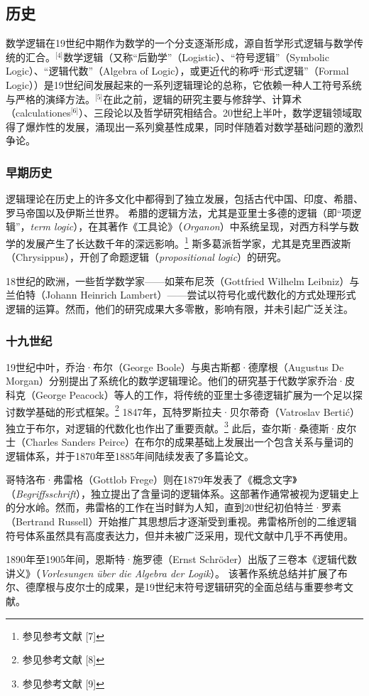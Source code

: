\subsection{历史}
数学逻辑在19世纪中期作为数学的一个分支逐渐形成，源自哲学形式逻辑与数学传统的汇合。\(^\text{[4]}\)数学逻辑（又称“后勤学”（Logistic）、“符号逻辑”（Symbolic Logic）、“逻辑代数”（Algebra of Logic），或更近代的称呼“形式逻辑”（Formal Logic））是19世纪间发展起来的一系列逻辑理论的总称，它依赖一种人工符号系统与严格的演绎方法。\(^\text{[5]}\)在此之前，逻辑的研究主要与修辞学、计算术（calculationes\(^\text{[6]}\)）、三段论以及哲学研究相结合。20世纪上半叶，数学逻辑领域取得了爆炸性的发展，涌现出一系列奠基性成果，同时伴随着对数学基础问题的激烈争论。
\subsubsection{早期历史}
逻辑理论在历史上的许多文化中都得到了独立发展，包括古代中国、印度、希腊、罗马帝国以及伊斯兰世界。  
希腊的逻辑方法，尤其是亚里士多德的逻辑（即“项逻辑”，\textit{term logic}），在其著作《工具论》（\textit{Organon}）中系统呈现，对西方科学与数学的发展产生了长达数千年的深远影响。\footnote{参见参考文献 [7]}  
斯多葛派哲学家，尤其是克里西波斯（Chrysippus），开创了命题逻辑（\textit{propositional logic}）的研究。

18世纪的欧洲，一些哲学数学家——如莱布尼茨（Gottfried Wilhelm Leibniz）与兰伯特（Johann Heinrich Lambert）——尝试以符号化或代数化的方式处理形式逻辑的运算。然而，他们的研究成果大多零散，影响有限，并未引起广泛关注。

\subsubsection{十九世纪}

19世纪中叶，乔治·布尔（George Boole）与奥古斯都·德摩根（Augustus De Morgan）分别提出了系统化的数学逻辑理论。他们的研究基于代数学家乔治·皮科克（George Peacock）等人的工作，将传统的亚里士多德逻辑扩展为一个足以探讨数学基础的形式框架。\footnote{参见参考文献 [8]}  
1847年，瓦特罗斯拉夫·贝尔蒂奇（Vatroslav Bertić）独立于布尔，对逻辑的代数化也作出了重要贡献。\footnote{参见参考文献 [9]}  
此后，查尔斯·桑德斯·皮尔士（Charles Sanders Peirce）在布尔的成果基础上发展出一个包含关系与量词的逻辑体系，并于1870年至1885年间陆续发表了多篇论文。

哥特洛布·弗雷格（Gottlob Frege）则在1879年发表了《概念文字》（\textit{Begriffsschrift}），独立提出了含量词的逻辑体系。这部著作通常被视为逻辑史上的分水岭。然而，弗雷格的工作在当时鲜为人知，直到20世纪初伯特兰·罗素（Bertrand Russell）开始推广其思想后才逐渐受到重视。弗雷格所创的二维逻辑符号体系虽然具有高度表达力，但并未被广泛采用，现代文献中几乎不再使用。

1890年至1905年间，恩斯特·施罗德（Ernst Schröder）出版了三卷本《逻辑代数讲义》（\textit{Vorlesungen über die Algebra der Logik}）。  
该著作系统总结并扩展了布尔、德摩根与皮尔士的成果，是19世纪末符号逻辑研究的全面总结与重要参考文献。
